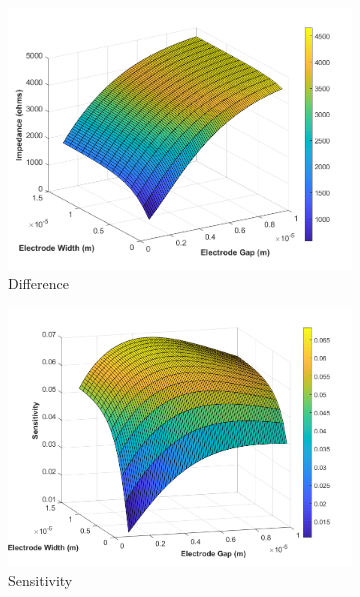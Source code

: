 \begin{figure}[h]
    \centering
    \begin{subfigure}[b]{0.49\textwidth}
        \centering
        \includegraphics[width=\textwidth]{images/analytic_difference.png}
        \caption{Difference}
    \end{subfigure}
    \hfill
    \begin{subfigure}[b]{0.49\textwidth}
        \centering
        \includegraphics[width=\textwidth]{images/analytic_sun_surface.png}
        \caption{Sensitivity}
    \end{subfigure}
    \\
    \vspace{0.1 in}
    \begin{subfigure}[b]{0.49\textwidth}

\end{subfigure}
\end{figure}
